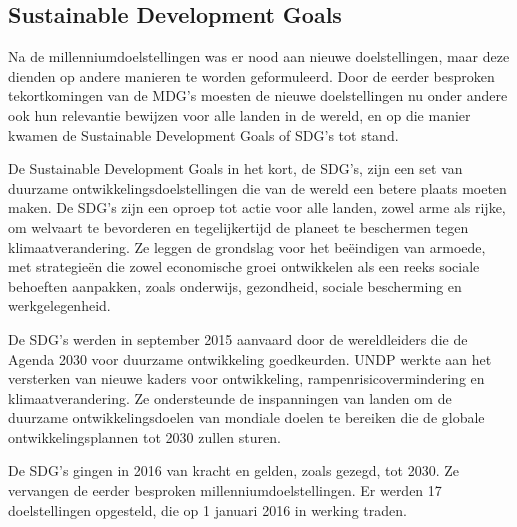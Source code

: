 \subsection{Sustainable Development Goals}
Na de millenniumdoelstellingen was er nood aan nieuwe doelstellingen, maar deze dienden op andere manieren te worden geformuleerd. Door de eerder besproken tekortkomingen van de MDG's moesten de nieuwe doelstellingen nu onder andere ook hun relevantie bewijzen voor alle landen in de wereld, en op die manier kwamen de Sustainable Development Goals of SDG's tot stand.  \autocite{VN2015}

De Sustainable Development Goals in het kort, de SDG's, zijn een set van duurzame ontwikkelingsdoelstellingen die van de wereld een betere plaats moeten maken. De SDG’s zijn een oproep tot actie voor alle landen, zowel arme als rijke, om welvaart te bevorderen en tegelijkertijd de planeet te beschermen tegen klimaatverandering. Ze leggen de grondslag voor het beëindigen van armoede, met strategieën die zowel economische groei ontwikkelen als een reeks sociale behoeften aanpakken, zoals onderwijs, gezondheid, sociale bescherming en werkgelegenheid. \autocite{VerenigdeNaties2004}


De SDG's werden in september 2015 aanvaard door de wereldleiders die de Agenda 2030 voor duurzame ontwikkeling goedkeurden. UNDP werkte aan het versterken van nieuwe kaders voor ontwikkeling, rampenrisicovermindering en klimaatverandering. Ze ondersteunde de inspanningen van landen om de duurzame ontwikkelingsdoelen van mondiale doelen te bereiken die de globale ontwikkelingsplannen tot 2030 zullen sturen.

De SDG's gingen in 2016 van kracht en gelden, zoals gezegd, tot 2030. Ze vervangen de eerder besproken millenniumdoelstellingen. Er werden 17 doelstellingen opgesteld, die op 1 januari 2016 in werking traden. \autocite{DevelopmentProgram2020}
 
